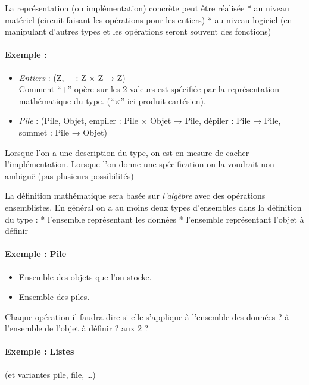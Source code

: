\documentclass[]{article}
\providecommand{\tightlist}{%
  \setlength{\itemsep}{0pt}\setlength{\parskip}{0pt}}
\let\oldparagraph\paragraph
\renewcommand{\paragraph}[1]{\oldparagraph{#1}\mbox{}}
\begin{document}
La représentation (ou implémentation) concrète peut être réalisée * au
niveau matériel (circuit faisant les opérations pour les entiers) * au
niveau logiciel (en manipulant d'autres types et les opérations seront
souvent des fonctions)

\paragraph{Exemple :}\label{exemple}

\begin{itemize}
\item
  \emph{Entiers} : (Z, + : Z × Z → Z)\\
  Comment ``+'' opère sur les 2 valeurs est spécifiée par la
  représentation mathématique du type. (``×'' ici produit cartésien).
\item
  \emph{Pile} : (Pile, Objet, empiler : Pile × Objet → Pile, dépiler :
  Pile → Pile, sommet : Pile → Objet)
\end{itemize}

Lorsque l'on a une description du type, on est en mesure de cacher
l'implémentation. Lorsque l'on donne une spécification on la voudrait
non ambiguë (pas plusieurs possibilités)

La définition mathématique sera basée sur \emph{l'algèbre} avec des
opérations ensemblistes. En général on a au moins deux types d'ensembles
dans la définition du type : * l'ensemble représentant les données *
l'ensemble représentant l'objet à définir

\paragraph{Exemple : Pile}\label{exemple-pile}

\begin{itemize}
\tightlist
\item
  Ensemble des objets que l'on stocke.
\item
  Ensemble des piles.
\end{itemize}

Chaque opération il faudra dire si elle s'applique à l'ensemble des
données ? à l'ensemble de l'objet à définir ? aux 2 ?

\paragraph{Exemple : Listes}\label{exemple-listes}

(et variantes pile, file, \ldots{})
\end{document}
